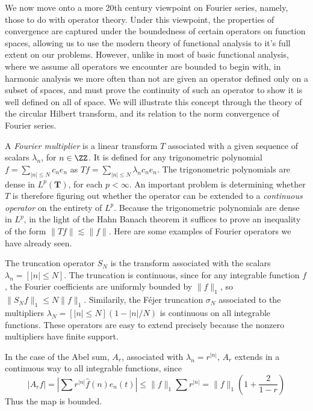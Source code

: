 We now move onto a more 20th century viewpoint on Fourier series, namely, those to do with operator theory. Under this viewpoint, the properties of convergence are captured under the boundedness of certain operators on function spaces, allowing us to use the modern theory of functional analysis to it's full extent on our problems. However, unlike in most of basic functional analysis, where we assume all operators we encounter are bounded to begin with, in harmonic analysis we more often than not are given an operator defined only on a subset of spaces, and must prove the continuity of such an operator to show it is well defined on all of space. We will illustrate this concept through the theory of the circular Hilbert transform, and its relation to the norm convergence of Fourier series.

A \emph{Fourier multiplier} is a linear transform $T$ associated with a given sequence of scalars $\lambda_n$, for $n \in \ZZ$. It is defined for any trigonometric polynomial $f = \sum_{|n| \leq N} c_n e_n$ as $Tf = \sum_{|n| \leq N} \lambda_n c_n e_n$. The trigonometric polynomials are dense in $L^p(\mathbf{T})$, for each $p < \infty$. An important problem is determining whether $T$ is therefore figuring out whether the operator can be extended to a {\it continuous operator} on the entirety of $L^p$. Because the trigonometric polynomials are dense in $L^p$, in the light of the Hahn Banach theorem it suffices to prove an inequality of the form $\| Tf \| \lesssim \| f \|$. Here are some examples of Fourier operators we have already seen.

\begin{example}
    The truncation operator $S_N$ is the transform associated with the scalars $\lambda_n = [|n| \leq N]$. The truncation is continuous, since for any integrable function $f$, the Fourier coefficients are uniformly bounded by $\| f \|_1$, so $\| S_N f \|_1 \leq N \| f \|_1$. Similarily, the F\'{e}jer truncation $\sigma_N$ associated to the multipliers $\lambda_N = [|n| \leq N](1 - |n|/N)$ is continuous on all integrable functions. These operators are easy to extend precisely because the nonzero multipliers have finite support.
\end{example}

\begin{example}
    In the case of the Abel sum, $A_r$, associated with $\lambda_n = r^{|n|}$, $A_r$ extends in a continuous way to all integrable functions, since
    \[ |A_r f| = \left| \sum r^{|n|} \widehat{f}(n) e_n(t) \right| \leq \| f \|_1 \sum r^{|n|} = \| f \|_1 \left( 1 + \frac{2}{1 - r} \right) \]
    Thus the map is bounded.
\end{example}

